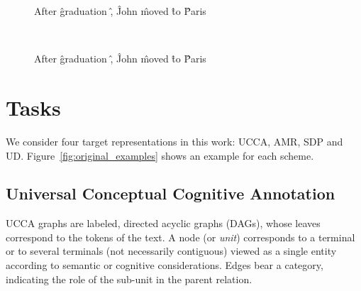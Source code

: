 \documentclass[11pt,a4paper]{article}
\begin{document}
\begin{figure*}
\begin{subfigure}[t]{0.5\textwidth}
	\begin{dependency}[theme = simple]
	\begin{deptext}[column sep=.1em,ampersand replacement=\^]
	After \^ graduation \^ , \^ John \^ moved \^ to \^ Paris \\
	\end{deptext}
	\end{dependency}
  \label{fig:original_example_sdp}
\end{subfigure}
~
\begin{subfigure}[t]{0.5\textwidth}
	\begin{dependency}[theme = simple]
	\begin{deptext}[column sep=.1em,ampersand replacement=\^]
	After \^ graduation \^ , \^ John \^ moved \^ to \^ Paris \\
	\end{deptext}
	\end{dependency}
  \label{fig:original_example_ud}
\end{subfigure}

\caption{Examples.}
\label{fig:original_examples}
\end{figure*}

\section{Tasks}\label{sec:tasks}

We consider four target representations in this work: UCCA, AMR, SDP and UD.
Figure~\ref{fig:original_examples} shows an example for each scheme.

\subsection{Universal Conceptual Cognitive Annotation}\label{sec:ucca}

UCCA graphs are labeled, directed acyclic graphs (DAGs),
whose leaves correspond to the tokens of
the text. A node (or {\it unit}) corresponds to a terminal or
to several terminals (not necessarily contiguous) viewed as a
single entity according to semantic or cognitive considerations.
Edges bear a category, indicating the role of the sub-unit in the parent relation.
\end{document}
